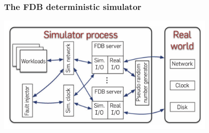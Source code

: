 
\begin{frame}
    \frametitle{The FDB deterministic simulator}
    \begin{center}
        \includegraphics[width=0.8\textwidth]{img/3-Testing/The FDB deterministic simulator.png}
    \end{center}
    
\end{frame}


